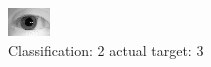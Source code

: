 \begin{figure}[h!]
\begin{center}
\includegraphics[width=0.60\columnwidth]{figures/ID1040_class_2_target_3.png}
\end{center}
\caption{ Classification: 2 actual target: 3}
\label{fig:ID1040_class_2_target_3}
\end{figure}
